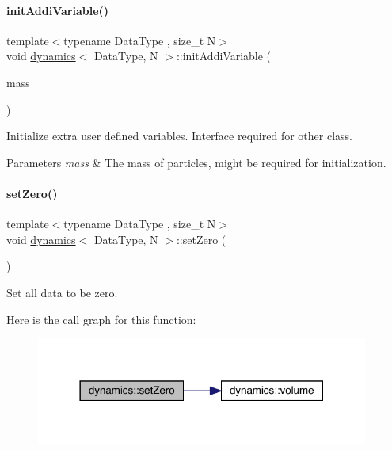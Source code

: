 \paragraph{\texorpdfstring{init\+Addi\+Variable()}{initAddiVariable()}}
{\footnotesize\ttfamily template$<$typename Data\+Type , size\+\_\+t N$>$ \\
void \mbox{\hyperlink{classdynamics}{dynamics}}$<$ Data\+Type, N $>$\+::init\+Addi\+Variable (\begin{DoxyParamCaption}\item[{\mbox{\hyperlink{classdynamics_ac31f831ea1577092662dafd2daba0f48}{Scalar\+Array}} \&}]{mass }\end{DoxyParamCaption})\hspace{0.3cm}{\ttfamily [inline]}}



Initialize extra user defined variables. Interface required for other class. 


\begin{DoxyParams}{Parameters}
{\em mass} & The mass of particles, might be required for initialization. \\
\hline
\end{DoxyParams}
\mbox{\label{classdynamics_a4dc0dd48fd48ef5cfc0128faaeb22b32}} 
\paragraph{\texorpdfstring{set\+Zero()}{setZero()}}
{\footnotesize\ttfamily template$<$typename Data\+Type , size\+\_\+t N$>$ \\
void \mbox{\hyperlink{classdynamics}{dynamics}}$<$ Data\+Type, N $>$\+::set\+Zero (\begin{DoxyParamCaption}{ }\end{DoxyParamCaption})\hspace{0.3cm}{\ttfamily [inline]}}



Set all data to be zero. 

Here is the call graph for this function\+:\nopagebreak
\begin{figure}[H]
\begin{center}
\leavevmode
\includegraphics[width=310pt]{classdynamics_a4dc0dd48fd48ef5cfc0128faaeb22b32_cgraph}
\end{center}
\end{figure}
\mbox{\label{classdynamics_a414656e44a6981327ae59af4deea9b8c}} 

